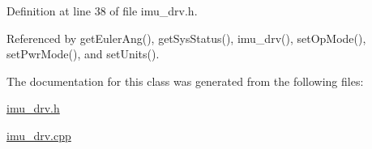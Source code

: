 Definition at line 38 of file imu\-\_\-drv.\-h.



Referenced by get\-Euler\-Ang(), get\-Sys\-Status(), imu\-\_\-drv(), set\-Op\-Mode(), set\-Pwr\-Mode(), and set\-Units().



The documentation for this class was generated from the following files\-:\begin{DoxyCompactItemize}
\item 
\hyperlink{imu__drv_8h}{imu\-\_\-drv.\-h}\item 
\hyperlink{imu__drv_8cpp}{imu\-\_\-drv.\-cpp}\end{DoxyCompactItemize}

